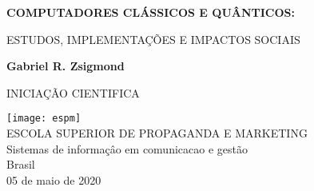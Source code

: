 \begin{titlepage}
    \begin{center}
        \vspace*{1cm}
        \LARGE
        \textbf{COMPUTADORES CLÁSSICOS E QUÂNTICOS:}
        
        \vspace{0.5cm}
        \large
        ESTUDOS, IMPLEMENTAÇÕES E IMPACTOS SOCIAIS
        
        \vspace{1.5cm}
        
        \textbf{Gabriel R. Zsigmond}
        \vfill
        
        INICIAÇÃO CIENTIFICA
        
        \vspace{0.8cm}
        
        \texttt{[image: espm]}\\
        \large
        ESCOLA SUPERIOR DE PROPAGANDA E MARKETING\\
        Sistemas de informaçâo em comunicacao e gestão\\
        Brasil\\
        05 de maio de 2020\\
        
    \end{center}
\end{titlepage}